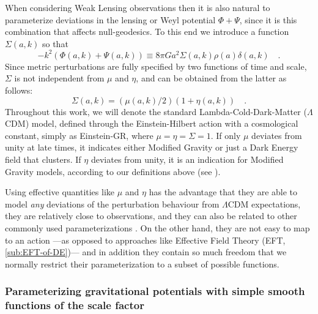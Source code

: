 When considering Weak Lensing observations then it is also natural
to parameterize deviations in the lensing or Weyl potential $\Phi+\Psi$,
since it is this combination that affects null-geodesics.
To this end we introduce a function $\Sigma(a,k)$ so that
\begin{equation}\label{eq:Sigma-def}
-k^{2}(\Phi(a,k)+\Psi(a,k))\equiv8\pi
Ga^{2}\Sigma(a,k)\rho(a)\delta(a,k) \quad .
\end{equation}
Since metric perturbations are fully specified by two functions of
time and scale, $\Sigma$ is not independent from $\mu$ and $\eta$,
and can be obtained from the latter as follows: 
\begin{equation}\label{eq:SigmaofMuEta}
\Sigma(a,k)=(\mu(a,k)/2)(1+\eta(a,k)) \quad.
\end{equation}
Throughout this work, we will denote the standard Lambda-Cold-Dark-Matter ($\Lambda$CDM) model,
defined through the Einstein-Hilbert action with a cosmological constant, simply as Einstein-GR, where $\mu=\eta=\Sigma=1$. 
If only $\mu$ deviates from unity at late times,
it indicates either Modified Gravity or just a Dark Energy field that clusters.
If $\eta$ deviates from unity, it is an indication for Modified Gravity models, according to our definitions above 
(see \cite{Joyce, Lombrisier}).


Using effective quantities like $\mu$ and $\eta$ has the advantage
that they are able to model {\em any} deviations of the perturbation
behaviour from $\Lambda$CDM expectations, they are relatively close 
to observations, and they can also be related to other commonly used 
parameterizations \cite{pogosian_how_2010}.
On the other hand, they are not
easy to map to an action ---as opposed to approaches like Effective
Field Theory (EFT, \cref{sub:EFT-of-DE})---  and in addition they
contain so much freedom that we normally restrict their parameterization
to a subset of possible functions.


\subsubsection{Parameterizing gravitational potentials with simple smooth functions of the scale factor \label{sub:param-smooth-funct}}

